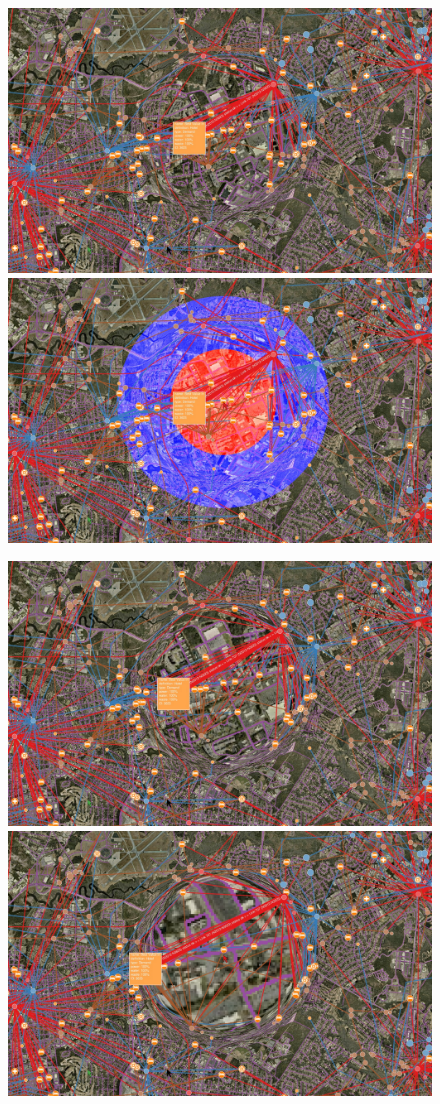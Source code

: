 \begin{figure}[htp]\centering
    \includegraphics[width=0.49\linewidth]{img/s_r_g_5_zoom.jpg}
    \includegraphics[width=0.49\linewidth]{img/s_r_g_5_zoom_color.jpg}
    \vspace{3 mm}

    \includegraphics[width=0.49\linewidth]{img/s_r_g_10_zoom.jpg}
    \includegraphics[width=0.49\linewidth]{img/s_r_g_20_zoom.jpg}
    \vspace{3 mm}


\end{figure}
